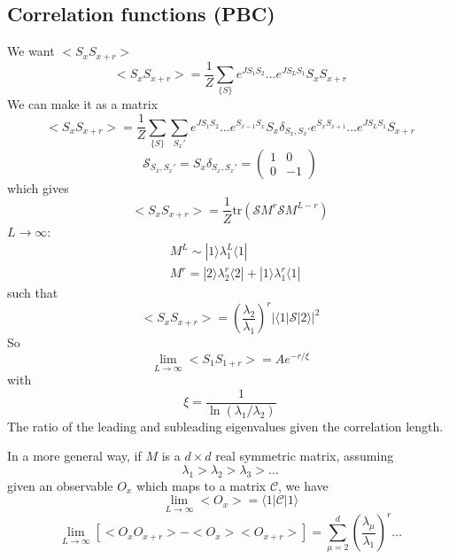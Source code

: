 \documentclass[a4paper]{book}
\theoremstyle{definition}
\theoremstyle{remark}
\begin{document}
\subsection{Correlation functions (PBC)}
We want $<S_x S_{x + r}>$
\begin{equation}
    <S_x S_{x + r}> = \frac{1}{Z}\sum_{\{S\}}e^{JS_1S_2}\dots e^{JS_LS_1} S_x S_{x+r}
\end{equation}
We can make it as a matrix 
\begin{equation}
    <S_x S_{x + r}> = \frac{1}{Z}\sum_{\{S\}} \sum_{S_x'} e^{JS_1S_2}\dots e^{S_{x-1}S_x}S_x\delta_{S_x, S_x'}e^{S_xS_{x+1}}\dots e^{JS_LS_1}  S_{x+r}
\end{equation}
\begin{equation}
    \mathcal{S}_{S_x, S_x'} = S_x\delta_{S_x, S_x'} = \begin{pmatrix}
        1 & 0 \\ 0 & -1
    \end{pmatrix}  
\end{equation}
which gives 
\begin{equation}
    <S_x S_{x + r}> = \frac{1}{Z} \text{tr}(\mathcal{S}M^r \mathcal{S}M^{L-r})
\end{equation}
\underline{$L \rightarrow \infty$}:
\begin{equation}
    \begin{aligned}
        &M^L \sim |1\rangle \lambda_1^L \langle 1| \\
        &M^r = |2\rangle \lambda_2^r \langle 2| + |1\rangle \lambda_1^r \langle 1|
    \end{aligned}
\end{equation}
such that 
\begin{equation}
    <S_x S_{x + r}> = \left(\frac{\lambda_2}{\lambda_1}\right)^r |\langle 1 | \mathcal{S}|2\rangle|^2
\end{equation}
So 
\begin{equation}
    \lim_{L\rightarrow \infty} <S_1S_{1+r}> = Ae^{-r/\xi}
\end{equation}
with 
\begin{equation}
    \xi = \frac{1}{\ln(\lambda_1 / \lambda_2)}
\end{equation}
The ratio of the leading and subleading eigenvalues given the correlation length.\par \medskip 

In a more general way, if $M$ is a $d\times d$ real symmetric matrix, assuming 
\begin{equation}
    \lambda_1 > \lambda_2 > \lambda_3 > \dots
\end{equation}
given an observable $O_x$ which maps to a matrix $\mathcal{C}$, we have 
\begin{equation}
    \lim _{L \rightarrow \infty} <O_x> = \langle 1|\mathcal{C}|1\rangle 
\end{equation}
\begin{equation}
    \lim_{L\rightarrow \infty} \left[<O_xO_{x+r}> - <O_x><O_{x+r}>\right] = \sum_{\mu = 2}^{d} \left(\frac{\lambda_\mu}{\lambda_1}\right)^r \dots
\end{equation}
\end{document}

